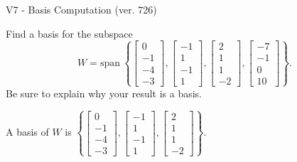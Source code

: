 \begin{exercise}
  \begin{exerciseTitle}V7 - Basis Computation (ver. 726)\end{exerciseTitle}
  \begin{exerciseStatement}
    Find a basis for the subspace 
\[W=\mathrm{span}\ \left\{\left[\begin{array}{r}
0 \\
-1 \\
-4 \\
-3
\end{array}\right] , \left[\begin{array}{r}
-1 \\
1 \\
-1 \\
1
\end{array}\right] , \left[\begin{array}{r}
2 \\
1 \\
1 \\
-2
\end{array}\right] , \left[\begin{array}{r}
-7 \\
-1 \\
0 \\
10
\end{array}\right]\right\}.\]
 Be sure to explain why your result is a basis.


  \end{exerciseStatement}
  \begin{exerciseAnswer}
   A basis of \(W\) is  \(\left\{\left[\begin{array}{r}
0 \\
-1 \\
-4 \\
-3
\end{array}\right] , \left[\begin{array}{r}
-1 \\
1 \\
-1 \\
1
\end{array}\right] , \left[\begin{array}{r}
2 \\
1 \\
1 \\
-2
\end{array}\right]\right\}\).
  


  \end{exerciseAnswer}
\end{exercise}